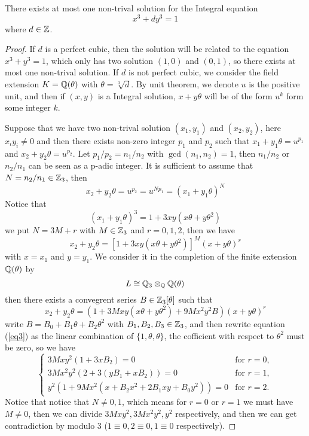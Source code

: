\begin{theorem}[Skolem] There exists at most one non-trival solution for the Integral equation
    \[x^3+dy^3=1\]
where \(d \in \mathbb{Z}\).
    \begin{proof}
        If \(d\) is a perfect cubic, then the solution will be related to the equation \(x^3+y^3=1\), which only has two solution \((1,0)\) and \((0,1)\), so there exists at most one non-trival solution. If \(d\) is not perfect cubic, we consider the field extension \(K = \mathbb{Q}(\theta)\) with \(\theta = \sqrt[3]{d}\). By unit theorem, we denote \(u\) is the positive unit, and then if \((x,y)\) is a Integral solution, \(x+y\theta\) will be of the form \(u^k\) form some integer \(k\).

        Suppose that we have two non-trival solution \((x_1,y_1)\) and \((x_2,y_2)\), here \(x_iy_i \neq 0\) and then there exists non-zero integer \(p_1\) and \(p_2\) such that \(x_1+y_1\theta = u^{p_1}\) and \(x_2+y_2\theta = u^{p_2}\). Let \(p_1/p_2 = n_1/n_2\) with \(\gcd(n_1,n_2)=1\), then \(n_1/n_2\) or \(n_2/n_1\) can be seen as a p-adic integer. It is sufficient to assume that \(N = n_2/n_1 \in \mathbb{Z}_3\), then 
        \[x_2+y_2\theta = u^{p_2} = u^{Np_1} = (x_1+y_1\theta)^N\]
        Notice that \[(x_1+y_1\theta)^3 = 1+3xy(x\theta+y\theta^2)\]
        we put \(N= 3M+r\) with \(M \in \mathbb{Z}_3\) and \(r=0,1,2\), then we have 
        \[x_2+y_2\theta = [1+3xy(x\theta+y\theta^2)]^M(x+y\theta)^r\]
        with \(x=x_1\) and \(y=y_1\). We consider it in the completion of the finite extension \(\mathbb{Q} (\theta)\) by 
        \[L \cong \mathbb{Q}_3 \otimes_{\mathbb{Q}} \mathbb{Q}(\theta)\]
        then there exists a convegrent series \(B \in \mathbb{Z}_3[\theta]\) such that
        \begin{equation} \label{eq3}
            x_2 + y_2 \theta = \left( 1 + 3M x y (x\theta + y\theta^2) + 9M x^2 y^2 B \right) (x + y\theta)^r 
        \end{equation}
        write \(B=B_0+B_1\theta+B_2\theta^2\) with \(B_1,B_2,B_3 \in \mathbb{Z}_3\), and then rewrite equation (\ref{eq3}) as the linear combination of \(\{1,\theta,\theta\}\), the cofficient with respect to \(\theta^2\) must be zero, so we have 
        \[
\begin{cases}
3M x y^2 (1 + 3x B_2)=0 & \text{for } r = 0, \\
3M x^2 y^2 \left( 2 + 3(y B_1 + x B_2) \right)=0 & \text{for } r = 1, \\
y^2 \left( 1 + 9M x^2 (x + B_2 x^2 + 2B_1 x y + B_0 y^2) \right)=0 & \text{for } r = 2.
\end{cases}
\]
        Notice that notice that \(N \neq 0, 1\), which means for \(r=0\) or \(r=1\) we must have \(M\neq 0\), then we can divide \(3Mxy^2, 3Mx^2y^2, y^2\) respectively, and then we can get contradiction by modulo 3 (\(1 \equiv 0, 2 \equiv 0, 1\equiv 0\) respectively).
            
    \end{proof}
\end{theorem}

